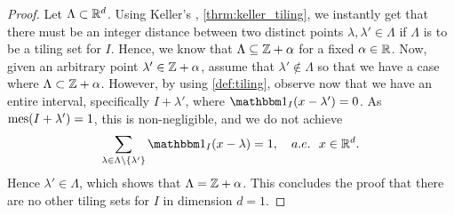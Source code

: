 \documentclass[../thesis.tex]{subfiles}
\begin{document}
\begin{proof}  %
    Let $\Lambda \subset \mathbb{R}^d$. Using Keller's , \cref{thrm:keller_tiling}, we instantly get that there must be an integer distance between two distinct points $\lambda,\lambda' \in \Lambda$ if $\Lambda$ is to be a tiling set for $I$. Hence, we know that $\Lambda \subseteq \mathbb{Z} +\alpha$ for a fixed $\alpha\in \mathbb{R}$. Now, given an arbitrary point $\lambda' \in \mathbb{Z} +\alpha$, assume that $\lambda'\notin \Lambda$ so that we have a case where $\Lambda \subset \mathbb{Z}+\alpha$. However, by using \cref{def:tiling}, observe now that we have an entire interval, specifically $I+\lambda'$, where $\indicator{I}{x - \lambda'} = 0$. As $\operatorname{mes}(I+\lambda') = 1 $, this is non-negligible, and we do not achieve
    \begin{equation*}
        \sum_{\lambda \in \Lambda\setminus \braq{\lambda'}} \indicator{I}{x-\lambda} = 1, \quad a.e. \text{\space\space} x \in \R^d.
    \end{equation*}
    Hence $\lambda' \in \Lambda$, which shows that $\Lambda = \mathbb{Z}+\alpha$. This concludes the proof that there are no other tiling sets for $I$ in dimension $d=1$. %
\end{proof}
\end{document}
